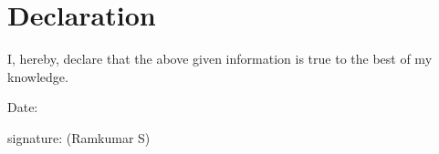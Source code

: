 \section{Declaration}
I, hereby, declare that the above given information is true to the best of my knowledge.
\vspace{2cm}



\begin{minipage}[t]{0.7\linewidth}
	Date:
\end{minipage}
\begin{minipage}[t]{0.5\linewidth}
	signature:
	(Ramkumar S)
\end{minipage}

